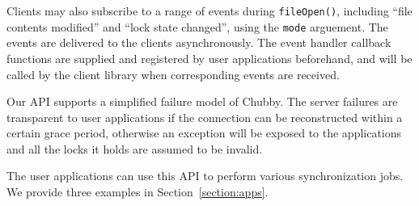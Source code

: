 Clients may also subscribe to a range of events during \texttt{fileOpen()},
including ``file contents modified'' and ``lock state changed'',
using the \texttt{mode} arguement.
The events are delivered to the clients asynchronously.
The event handler callback functions are supplied and registered by user
applications beforehand, and will be called by the client library when
corresponding events are received.

Our API supports a simplified failure model of Chubby. The server failures
are transparent to user applications if the connection can be reconstructed
within a certain grace period, otherwise an exception will be exposed to
the applications and all the locks it holds are assumed to be invalid.

The user applications can use this API to perform various synchronization
jobs. We provide three examples in Section~\ref{section:apps}.



